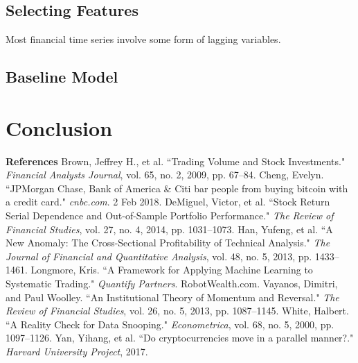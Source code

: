 \documentclass[12pt,twoside]{article}
\begin{document}
\subsection{Selecting Features}

Most financial time series involve some form of lagging variables.

\subsection{Baseline Model}



\section{Conclusion}



\newpage
{\large \textbf{References}}
\bigbreak
Brown, Jeffrey H., et al. ``Trading Volume and Stock Investments." \textit{Financial Analysts Journal}, vol. 65, no. 2, 2009, pp. 67–84.
\bigbreak
Cheng, Evelyn. ``JPMorgan Chase, Bank of America \& Citi bar people from buying bitcoin with a credit card." \textit{cnbc.com}. 2 Feb 2018.
\bigbreak
DeMiguel, Victor, et al. ``Stock Return Serial Dependence and Out-of-Sample Portfolio Performance." \textit{The Review of Financial Studies}, vol. 27, no. 4, 2014, pp. 1031–1073.
\bigbreak
Han, Yufeng, et al. ``A New Anomaly: The Cross-Sectional Profitability of Technical Analysis." \textit{The Journal of Financial and Quantitative Analysis}, vol. 48, no. 5, 2013, pp. 1433–1461.
\bigbreak
Longmore, Kris. ``A Framework for Applying Machine Learning to Systematic Trading." \textit{Quantify Partners}. RobotWealth.com.
\bigbreak
Vayanos, Dimitri, and Paul Woolley. ``An Institutional Theory of Momentum and Reversal." \textit{The Review of Financial Studies}, vol. 26, no. 5, 2013, pp. 1087–1145.
\bigbreak
White, Halbert. ``A Reality Check for Data Snooping." \textit{Econometrica}, vol. 68, no. 5, 2000, pp. 1097–1126.
\bigbreak
Yan, Yihang, et al. ``Do cryptocurrencies move in a parallel manner?." \textit{Harvard University Project}, 2017.
\bigbreak
\end{document}

